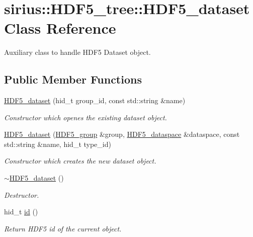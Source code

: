 \hypertarget{classsirius_1_1_h_d_f5__tree_1_1_h_d_f5__dataset}{}\section{sirius\+:\+:H\+D\+F5\+\_\+tree\+:\+:H\+D\+F5\+\_\+dataset Class Reference}
\label{classsirius_1_1_h_d_f5__tree_1_1_h_d_f5__dataset}


Auxiliary class to handle H\+D\+F5 Dataset object.  


\subsection*{Public Member Functions}
\begin{DoxyCompactItemize}
\item 
\hyperlink{classsirius_1_1_h_d_f5__tree_1_1_h_d_f5__dataset_a9e3e6357f53fb5e44bd644ec6ae2140a}{H\+D\+F5\+\_\+dataset} (hid\+\_\+t group\+\_\+id, const std\+::string \&name)
\begin{DoxyCompactList}\small\item\em Constructor which openes the existing dataset object. \end{DoxyCompactList}\item 
\hyperlink{classsirius_1_1_h_d_f5__tree_1_1_h_d_f5__dataset_a3efc8443b78a1abcbec79d239243ed1f}{H\+D\+F5\+\_\+dataset} (\hyperlink{classsirius_1_1_h_d_f5__tree_1_1_h_d_f5__group}{H\+D\+F5\+\_\+group} \&group, \hyperlink{classsirius_1_1_h_d_f5__tree_1_1_h_d_f5__dataspace}{H\+D\+F5\+\_\+dataspace} \&dataspace, const std\+::string \&name, hid\+\_\+t type\+\_\+id)
\begin{DoxyCompactList}\small\item\em Constructor which creates the new dataset object. \end{DoxyCompactList}\item 
\hyperlink{classsirius_1_1_h_d_f5__tree_1_1_h_d_f5__dataset_a3cb7d4e16f99d4b2c9792702da0a356b}{$\sim$\+H\+D\+F5\+\_\+dataset} ()
\begin{DoxyCompactList}\small\item\em Destructor. \end{DoxyCompactList}\item 
hid\+\_\+t \hyperlink{classsirius_1_1_h_d_f5__tree_1_1_h_d_f5__dataset_a8d9b3a57bb5fc2fd6dc97c308121dcff}{id} ()
\begin{DoxyCompactList}\small\item\em Return H\+D\+F5 id of the current object. \end{DoxyCompactList}\end{DoxyCompactItemize}
